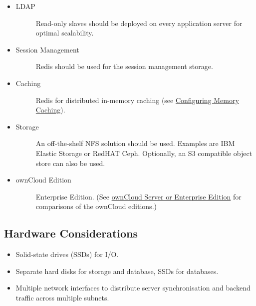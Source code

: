 \documentclass[letterpaper,10pt,english]{sphinxmanual}
\begin{document}
\begin{itemize}
\begin{description}
\end{description}

\item {} \begin{description}
\item[{LDAP}] \leavevmode
Read-only slaves should be deployed on every application server for
optimal scalability.

\end{description}

\item {} \begin{description}
\item[{Session Management}] \leavevmode
Redis should be used for the session management storage.

\end{description}

\item {} \begin{description}
\item[{Caching}] \leavevmode
Redis for distributed in-memory caching (see \href{https://doc.owncloud.org/server/9.0/admin\_manual/configuration\_server/caching\_configuration.html}{Configuring Memory
Caching}).

\end{description}

\item {} \begin{description}
\item[{Storage}] \leavevmode
An off-the-shelf NFS solution should be used. Examples are IBM Elastic
Storage or RedHAT Ceph. Optionally, an S3 compatible object store can also
be used.

\end{description}

\item {} \begin{description}
\item[{ownCloud Edition}] \leavevmode
Enterprise Edition. (See \href{https://owncloud.com/owncloud-server-or-enterprise-edition/}{ownCloud Server or Enterprise Edition} for
comparisons of the ownCloud editions.)

\end{description}

\end{itemize}


\subsection{Hardware Considerations}
\label{installation/deployment_recommendations:hardware-considerations}\begin{itemize}
\item {} 
Solid-state drives (SSDs) for I/O.

\item {} 
Separate hard disks for storage and database, SSDs for databases.

\item {} 
Multiple network interfaces to distribute server synchronisation and backend
traffic across multiple subnets.

\end{itemize}
\end{document}
